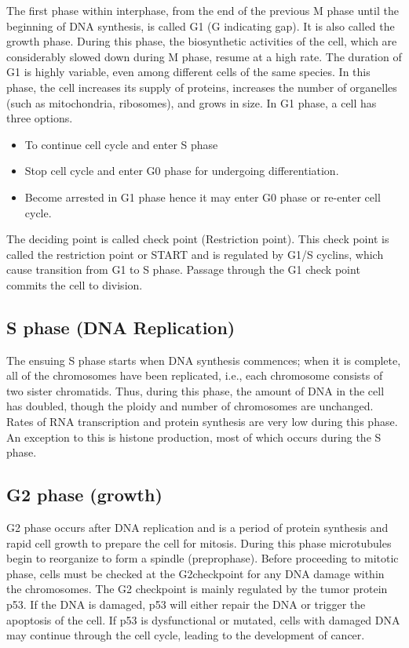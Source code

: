 The first phase within interphase, from the end of the previous M phase until the beginning of DNA synthesis, is called G1 (G indicating gap). It is also called the growth phase. During this phase, the biosynthetic activities of the cell, which are considerably slowed down during M phase, resume at a high rate. The duration of G1 is highly variable, even among different cells of the same species. In this phase, the cell increases its supply of proteins, increases the number of organelles (such as mitochondria, ribosomes), and grows in size. In G1 phase, a cell has three options.

\begin{itemize}
\tightlist
\item
  To continue cell cycle and enter S phase
\item
  Stop cell cycle and enter G0 phase for undergoing differentiation.
\item
  Become arrested in G1 phase hence it may enter G0 phase or re-enter cell cycle.
\end{itemize}

The deciding point is called check point (Restriction point). This check point is called the restriction point or START and is regulated by G1/S cyclins, which cause transition from G1 to S phase. Passage through the G1 check point commits the cell to division.

\hypertarget{s-phase-dna-replication}{%
\subsection{S phase (DNA Replication)}\label{s-phase-dna-replication}}

The ensuing S phase starts when DNA synthesis commences; when it is complete, all of the chromosomes have been replicated, i.e., each chromosome consists of two sister chromatids. Thus, during this phase, the amount of DNA in the cell has doubled, though the ploidy and number of chromosomes are unchanged. Rates of RNA transcription and protein synthesis are very low during this phase. An exception to this is histone production, most of which occurs during the S phase.

\hypertarget{g2-phase-growth}{%
\subsection{G2 phase (growth)}\label{g2-phase-growth}}

G2 phase occurs after DNA replication and is a period of protein synthesis and rapid cell growth to prepare the cell for mitosis. During this phase microtubules begin to reorganize to form a spindle (preprophase). Before proceeding to mitotic phase, cells must be checked at the G2checkpoint for any DNA damage within the chromosomes. The G2 checkpoint is mainly regulated by the tumor protein p53. If the DNA is damaged, p53 will either repair the DNA or trigger the apoptosis of the cell. If p53 is dysfunctional or mutated, cells with damaged DNA may continue through the cell cycle, leading to the development of cancer.

